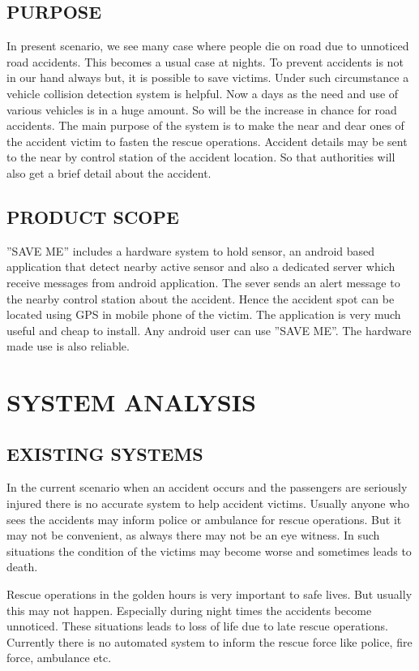\documentclass[12pt,a4paper,oneside]{report}
\begin{document}
{\section{PURPOSE}
\par In present scenario, we see many case where people die on road due to unnoticed road
accidents. This becomes a usual case at nights. To prevent accidents is not in our hand always but, it is possible to save victims. Under such circumstance a vehicle collision detection system is helpful. Now a days as the need and use of various vehicles is in a huge amount. So will be the increase in chance for road accidents. 
 The main purpose of the system is to make the near and dear ones of the accident victim to fasten the rescue operations. Accident  details may be sent to the near by control station of the accident location. So that authorities will also get a brief detail about the accident.  
\section{PRODUCT SCOPE}
\par  ”SAVE ME” includes a hardware system to hold sensor, an android based application
that detect nearby active sensor and also a dedicated server which receive messages from
android application. The sever sends an alert message to the nearby control station about the accident. Hence the accident spot can be located using GPS in mobile phone of the victim. The application is very much useful and cheap to install. Any android user can use ”SAVE ME”. The hardware made use is also reliable.\\

\chapter{SYSTEM ANALYSIS}
\hspace{0.2in} 
\section{EXISTING SYSTEMS}
	\par In the current scenario when an accident occurs and the passengers are seriously injured there is no accurate system to help accident victims. Usually anyone who sees the accidents may inform police or ambulance for rescue operations. But it may not be convenient, as always there may not be an eye witness. In such situations the condition of the victims may become worse and sometimes leads to death.
	\par Rescue operations in the golden hours is very important to safe lives. But usually this may not happen. Especially during night times the accidents become unnoticed. These situations leads to loss of life due to late rescue operations. Currently there is no automated system to inform the rescue force like police, fire force, ambulance etc.


}
\end{document}
